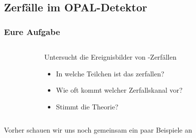  \subsection{Zerf\"alle im OPAL-Detektor}
 \begin{frame}
   \frametitle{Eure Aufgabe}
   \begin{columns}
     \begin{column}{0.15\textwidth}
     \end{column}
     \begin{column}{0.7\textwidth}
       \begin{block}{Untersucht die Ereignisbilder von \znull-Zerf\"allen}
         \begin{itemize}
         \item In welche Teilchen ist das \znull zerfallen?
         \item Wie oft kommt welcher Zerfallskanal vor?
         \item Stimmt die Theorie?
         \end{itemize}
       \end{block}
     \end{column}
     \begin{column}{0.15\textwidth}
     \end{column}
   \end{columns}
   \pause
   \vskip1.5cm
   \begin{center}
     \alert{Vorher schauen wir uns noch gemeinsam ein paar Beispiele an}
   \end{center}
 \end{frame}

